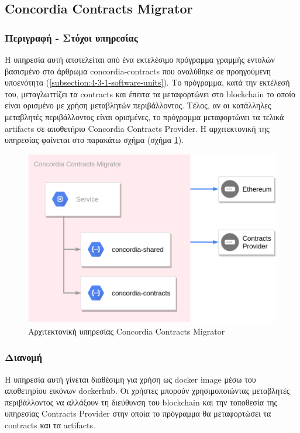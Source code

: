 \subsection{Concordia Contracts Migrator} \label{subsection:4-3-3-concordia-contracts-migrator}

\subsubsection{Περιγραφή - Στόχοι υπηρεσίας}

Η υπηρεσία αυτή αποτελείται από ένα εκτελέσιμο πρόγραμμα γραμμής εντολών βασισμένο στο άρθρωμα concordia-contracts που αναλύθηκε σε προηγούμενη υποενότητα (\ref{subsection:4-3-1-software-units}). Το πρόγραμμα, κατά την εκτέλεσή του, μεταγλωττίζει τα contracts και έπειτα τα μεταφορτώνει στο blockchain το οποίο είναι ορισμένο με χρήση μεταβλητών περιβάλλοντος. Τέλος, αν οι κατάλληλες μεταβλητές περιβάλλοντος είναι ορισμένες, το πρόγραμμα μεταφορτώνει τα τελικά artifacts σε αποθετήριο Concordia Contracts Provider. Η αρχιτεκτονική της υπηρεσίας φαίνεται στο παρακάτω σχήμα (σχήμα \ref{figure:4-3-concordia-contracts-migrator-architecture}).

\begin{figure}[H]
    \centering
    \includegraphics[width=.6\textwidth]{assets/figures/chapter-4/4.3.architecture-4.3.3.concordia-contracts-migrator-architecture.png}
    \caption{Αρχιτεκτονική υπηρεσίας Concordia Contracts Migrator}
    \label{figure:4-3-concordia-contracts-migrator-architecture}
\end{figure}

\subsubsection{Διανομή}

Η υπηρεσία αυτή γίνεται διαθέσιμη για χρήση ως docker image μέσω του αποθετηρίου εικόνων dockerhub. Οι χρήστες μπορούν χρησιμοποιώντας μεταβλητές περιβάλλοντος να αλλάξουν τη διεύθυνση του blockchain και την τοποθεσία της υπηρεσίας Contracts Provider στην οποία το πρόγραμμα θα μεταφορτώσει τα contracts και τα artifacts.
